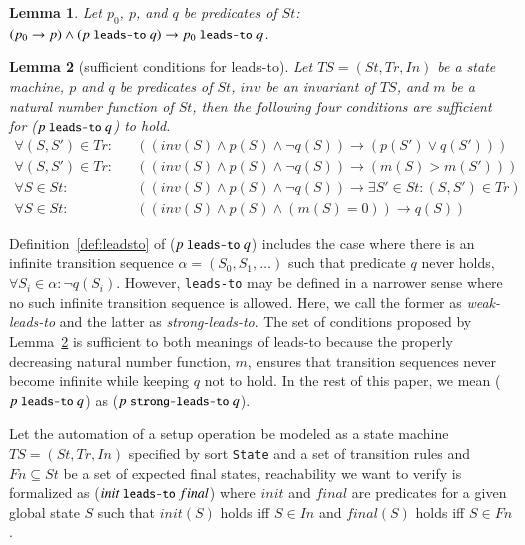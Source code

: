 \documentclass[12pt]{report}
\newtheorem{lemma}{Lemma}
\newcommand{\ra}{\rightarrow}
\newcommand{\mbstt}[1]{\mbox{\small{\tt {#1}}}}
\newcommand{\stt}[1]{{\small{\tt {#1}}}}
\begin{document}
\begin{lemma}
\label{def:p0leadstoq}
  Let $p_0$, $p$, and $q$ be predicates of $S\!t$:
  $(p_0 \ra p) \land (p~\mbstt{leads-to}~q) \ra
  p_0~\mbstt{leads-to}~q$.
\end{lemma}

\begin{lemma}[sufficient conditions for leads-to]
\label{def:sufcond}
  Let $TS=(S\!t,T\!r,In)$ be a state machine, $p$ and $q$ be predicates of
  $S\!t$, $inv$ be an invariant of $TS$, and $m$ be a natural number
  function of $S\!t$, then the following four conditions are sufficient
  for ($p~\mbstt{leads-to}~q$) to hold.
\begin{eqnarray*}
\forall (S,S')\in T\!r:&&((inv(S)\land p(S)\land\neg q(S))\ra(p(S')\lor q(S')))\\
\forall (S,S')\in T\!r:&&((inv(S)\land p(S)\land\neg q(S))\ra(m(S) > m(S')))\\
\forall S\in S\!t:&&((inv(S)\land p(S)\land\neg q(S))\ra\exists S'\in S\!t:(S,S')\in T\!r)\\
\forall S\in S\!t:&&((inv(S)\land p(S)\land(m(S) = 0)) \ra q(S))
\end{eqnarray*}
\end{lemma}
Definition~\ref{def:leadsto} of ($p~\mbstt{leads-to}~q$) includes the
case where there is an infinite transition sequence
$\alpha=(S\!_0,S\!_1,\dots)$ such that predicate $q$ never holds,
$\forall S\!_i\in\alpha:\neg q(S\!_i)$. However, \stt{leads-to} may be
defined in a narrower sense where no such infinite transition sequence
is allowed. Here, we call the former as {\it weak-leads-to} and the
latter as {\it strong-leads-to}. The set of conditions proposed by
Lemma~\ref{def:sufcond} is sufficient to both meanings of leads-to
because the properly decreasing natural number function, $m$, ensures
that transition sequences never become infinite while keeping $q$ not
to hold. In the rest of this paper, we mean ($p~\mbstt{leads-to}~q$)
as ($p~\mbstt{strong-leads-to}~q$).

Let the automation of a setup operation be modeled as a state machine
$TS=(S\!t,T\!r,In)$ specified by sort {\tt State} and a set of transition
rules
and
$Fn\subseteq S\!t$ be a set of expected final states, reachability
we want to verify is formalized as ($init~\mbstt{leads-to}~final$) where
$init$ and $final$ are predicates for a given global state $S$ such
that $init(S)$ holds iff $S \in In$ and $final(S)$ holds iff $S \in
Fn$. 
\end{document}
